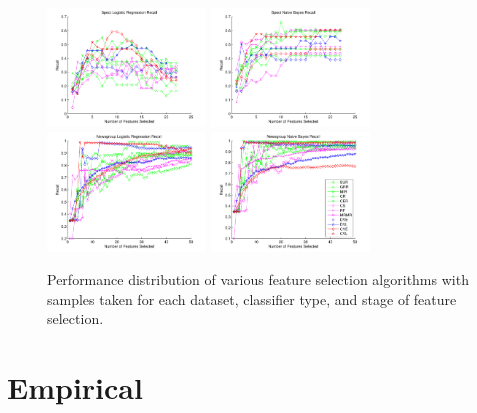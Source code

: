 \begin{figure}[tbp!]
\centering
\includegraphics[width=0.375\textwidth]{./figures/linegraphs/SpectLogisticRegressionRecall.pdf}
\includegraphics[width=0.375\textwidth]{./figures/linegraphs/SpectNaiveBayesRecall.pdf}\\
\includegraphics[width=0.375\textwidth]{./figures/linegraphs/NewsgroupLogisticRegressionRecall.pdf}
\includegraphics[width=0.375\textwidth]{./figures/linegraphs/NewsgroupNaiveBayesRecall.pdf}
\caption{\footnotesize Performance distribution of various feature selection algorithms with samples taken for each dataset, classifier type, and stage of feature selection.}
\label{fig:perf_vs_fs_alg}
\end{figure}

\section{Empirical}

